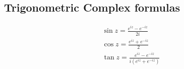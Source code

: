 \subsection{Trigonometric Complex formulas}

\begin{align}
    \sin{z} = \frac{e^{iz} - e^{-iz}}{2i} \nonumber \\
    \cos{z} = \frac{e^{iz} + e^{-iz}}{2} \nonumber \\
    \tan{z} = \frac{e^{iz} - e^{-iz}}{i(e^{iz} + e^{-iz})} \nonumber
\end{align}